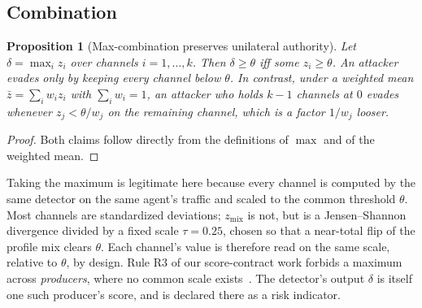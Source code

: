 \documentclass[conference]{IEEEtran}
\newtheorem{proposition}{Proposition}
\theoremstyle{remark}
\begin{document}
\subsection{Combination}
\begin{proposition}[Max-combination preserves unilateral authority]\label{prop:max}
Let $\delta=\max_i z_i$ over channels $i=1,\dots,k$. Then $\delta\ge\theta$ iff some $z_i\ge\theta$. An attacker evades only by keeping \emph{every} channel below $\theta$. In contrast, under a weighted mean $\bar z=\sum_iw_iz_i$ with $\sum_iw_i=1$, an attacker who holds $k-1$ channels at $0$ evades whenever $z_j<\theta/w_j$ on the remaining channel, which is a factor $1/w_j$ looser.
\end{proposition}
\begin{proof}
Both claims follow directly from the definitions of $\max$ and of the weighted mean.
\end{proof}
Taking the maximum is legitimate here because every channel is computed by the same detector on the same agent's traffic and scaled to the common threshold $\theta$. Most channels are standardized deviations; $z_{\mathrm{mix}}$ is not, but is a Jensen--Shannon divergence divided by a fixed scale $\tau=0.25$, chosen so that a near-total flip of the profile mix clears $\theta$. Each channel's value is therefore read on the same scale, relative to $\theta$, by design. Rule R3 of our score-contract work forbids a maximum across \emph{producers}, where no common scale exists~\cite{comp-contracts}. The detector's output $\delta$ is itself one such producer's score, and is declared there as a risk indicator.
\end{document}
